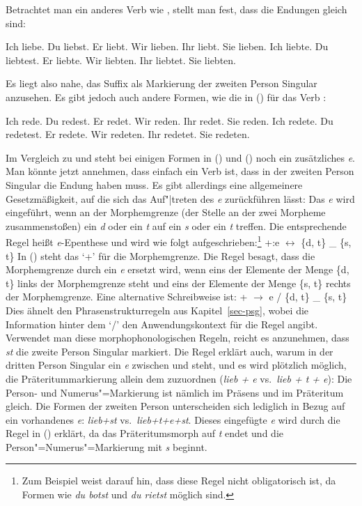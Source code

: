 \noindent
Betrachtet man ein anderes Verb wie \zb {}, stellt man fest, dass die
Endungen gleich sind:
\begin{multicols}{2}
\eal
\ex Ich liebe.
\ex Du  liebst.
\ex Er  liebt.
\ex Wir lieben.
\ex Ihr liebt.
\ex Sie lieben.
\zl
\eal
\ex Ich liebte.
\ex Du  liebtest.
\ex Er  liebte.
\ex Wir liebten.
\ex Ihr liebtet.
\ex Sie liebten.
\zl
\end{multicols}
\noindent
Es liegt also nahe, \zb das Suffix  als Markierung der zweiten Person Singular
anzusehen. Es gibt jedoch auch andere Formen, wie die in () für das Verb :
\begin{multicols}{2}
\eal
\ex Ich rede.
\ex Du  redest.
\ex Er  redet.
\ex Wir reden.
\ex Ihr redet.
\ex Sie reden.
\zl
\eal
\ex Ich redete.
\ex Du  redetest.
\ex Er  redete.
\ex Wir redeten.
\ex Ihr redetet.
\ex Sie redeten.
\zl
\end{multicols}
\noindent
Im Vergleich zu  und  steht bei einigen Formen in ()
und () noch ein zusätzliches \emph{e}. Man könnte jetzt annehmen, dass 
einfach ein Verb ist, dass in der zweiten Person Singular die Endung  haben
muss. Es gibt allerdings eine allgemeinere Gesetzmäßigkeit, auf die sich das Auf"|treten
des \emph{e} zurückführen lässt: Das \emph{e} wird eingeführt, wenn an der Morphemgrenze
(der Stelle an der zwei Morpheme zusammenstoßen) ein \emph{d} oder ein \emph{t} auf ein
\emph{s} oder ein \emph{t} treffen. Die entsprechende Regel heißt \emph{e}-Epenthese
und wird wie folgt aufgeschrieben:\footnote{
  Zum Beispiel \citet[]{Eisenberg98a} weist darauf hin, dass diese Regel nicht
  obligatorisch ist, da Formen wie \emph{du botst} und \emph{du rietst} möglich sind.%
}
\ea
\label{Regel-e-einfuegung}
+:e $\leftrightarrow$ \{d, t\} \_ \{s, t\}
\z
In () steht das `+' für die Morphemgrenze. Die Regel besagt, dass die Morphemgrenze
durch ein \emph{e} ersetzt wird, wenn eins der Elemente der Menge \{d, t\} links der Morphemgrenze
steht und eins der Elemente der Menge \{s, t\} rechts der Morphemgrenze.
Eine alternative Schreibweise ist:
\ea
+ $\to$ e / \{d, t\} \_ \{s, t\}
\z
Dies ähnelt den Phrasenstrukturregeln aus Kapitel~\ref{sec-psg}, wobei die Information hinter dem `/'
den Anwendungskontext für die Regel angibt. Verwendet man diese morphophonologischen Regeln,
reicht es anzunehmen, dass \emph{st} die zweite Person Singular markiert. Die Regel erklärt auch,
warum in der dritten Person Singular ein \emph{e} zwischen  und  steht,
und es wird plötzlich möglich, die Präteritummarkierung allein dem  zuzuordnen 
(\emph{lieb + e} vs.\ \emph{lieb + t + e}): Die Person- und
Numerus"=Markierung ist nämlich im Präsens und im Präteritum gleich. Die Formen der zweiten Person unterscheiden sich
lediglich in Bezug auf ein vorhandenes \emph{e}: \emph{lieb+st} vs.\ \emph{lieb+t+e+st}. Dieses
eingefügte \emph{e} wird durch die Regel in () erklärt, da das Präteritumsmorph
auf \emph{t} endet und die Person"=Numerus"=Markierung mit \emph{s} beginnt.

